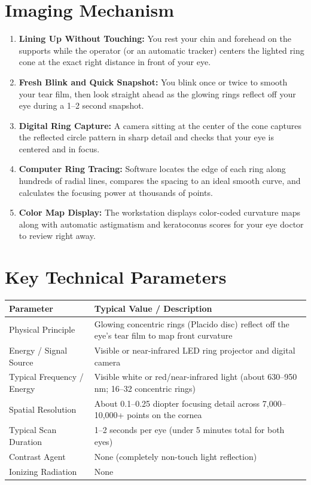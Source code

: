 \section{Imaging Mechanism}
\begin{enumerate}
    \item \textbf{Lining Up Without Touching:} You rest your chin and forehead on the supports while the operator (or an automatic tracker) centers the lighted ring cone at the exact right distance in front of your eye.
    \item \textbf{Fresh Blink and Quick Snapshot:} You blink once or twice to smooth your tear film, then look straight ahead as the glowing rings reflect off your eye during a 1--2 second snapshot.
    \item \textbf{Digital Ring Capture:} A camera sitting at the center of the cone captures the reflected circle pattern in sharp detail and checks that your eye is centered and in focus.
    \item \textbf{Computer Ring Tracing:} Software locates the edge of each ring along hundreds of radial lines, compares the spacing to an ideal smooth curve, and calculates the focusing power at thousands of points.
    \item \textbf{Color Map Display:} The workstation displays color-coded curvature maps along with automatic astigmatism and keratoconus scores for your eye doctor to review right away.
\end{enumerate}

\section{Key Technical Parameters}
\noindent
\begin{tabularx}{\textwidth}{@{}l X@{}}
\toprule
\textbf{Parameter} & \textbf{Typical Value / Description} \\
\midrule
Physical Principle & Glowing concentric rings (Placido disc) reflect off the eye's tear film to map front curvature \\
Energy / Signal Source & Visible or near-infrared LED ring projector and digital camera \\
Typical Frequency / Energy & Visible white or red/near-infrared light (about 630--950 nm; 16--32 concentric rings) \\
Spatial Resolution & About 0.1--0.25 diopter focusing detail across 7,000--10,000+ points on the cornea \\
Typical Scan Duration & 1--2 seconds per eye (under 5 minutes total for both eyes) \\
Contrast Agent & None (completely non-touch light reflection) \\
Ionizing Radiation & None \\
\bottomrule
\end{tabularx}

